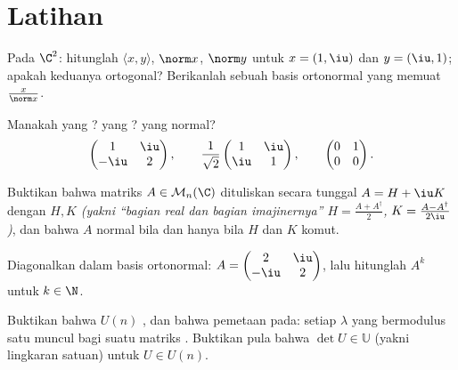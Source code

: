 \section{Latihan}

\begin{exercise}[$\star$]\label{exo:b2:hermitian:1}
Pada $\C^2$: hitunglah $\langle x, y\rangle$, $\norm x$, $\norm y$ untuk
$x = (1, \iu)$ dan $y = (\iu, 1)$; apakah keduanya ortogonal? Berikanlah
sebuah basis ortonormal yang memuat $\frac{x}{\norm x}$.
\end{exercise}

\begin{exercise}[$\star$]\label{exo:b2:hermitian:2}
Manakah yang ? yang ? yang normal?
\[
\begin{pmatrix} 1 & \iu\\ -\iu & 2 \end{pmatrix},
\qquad
\frac{1}{\sqrt2}\begin{pmatrix} 1 & \iu\\ \iu & 1\end{pmatrix},
\qquad
\begin{pmatrix} 0 & 1\\ 0 & 0 \end{pmatrix}.
\]
\end{exercise}

\begin{exercise}[$\star$]\label{exo:b2:hermitian:3}
Buktikan bahwa matriks $A \in \mathcal{M}_n(\C)$ dituliskan secara tunggal
$A = H + \iu K$ dengan $H, K$  \emph{(yakni ``bagian real dan
bagian imajinernya'' $H = \frac{A + A^\dagger}{2}$, $K = \frac{A -
A^\dagger}{2\iu}$)}, dan bahwa $A$ normal bila dan hanya bila $H$ dan $K$
komut.
\end{exercise}

\begin{exercise}[$\star\star$]\label{exo:b2:hermitian:4}
Diagonalkan dalam basis ortonormal: $A = \begin{pmatrix} 2 & \iu\\
-\iu & 2\end{pmatrix}$, lalu hitunglah $A^k$ untuk $k \in \N$.
\end{exercise}

\begin{exercise}[$\star\star$]\label{exo:b2:hermitian:5}
Buktikan bahwa $U(n)$ , dan bahwa pemetaan 
pada: setiap $\lambda$ yang bermodulus satu muncul bagi suatu matriks .
Buktikan pula bahwa $\det U \in \mathbb{U}$ (yakni lingkaran satuan) untuk $U \in
U(n)$.
\end{exercise}

